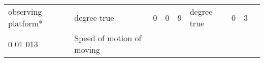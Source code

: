 \begin{longtable}[]{@{}lllllllll@{}}
\begin{minipage}[t]{0.08\columnwidth}
observing platform*\strut
\end{minipage} & \begin{minipage}[t]{0.08\columnwidth}\raggedright
degree true\strut
\end{minipage} & \begin{minipage}[t]{0.08\columnwidth}\raggedright
0\strut
\end{minipage} & \begin{minipage}[t]{0.08\columnwidth}\raggedright
0\strut
\end{minipage} & \begin{minipage}[t]{0.08\columnwidth}\raggedright
9\strut
\end{minipage} & \begin{minipage}[t]{0.08\columnwidth}\raggedright
degree true\strut
\end{minipage} & \begin{minipage}[t]{0.08\columnwidth}\raggedright
0\strut
\end{minipage} & \begin{minipage}[t]{0.08\columnwidth}\raggedright
3\strut
\end{minipage}\tabularnewline
\begin{minipage}[t]{0.08\columnwidth}\raggedright
0 01 013\strut
\end{minipage} & \begin{minipage}[t]{0.08\columnwidth}\raggedright
Speed of motion of moving


\end{minipage}
\end{longtable}
